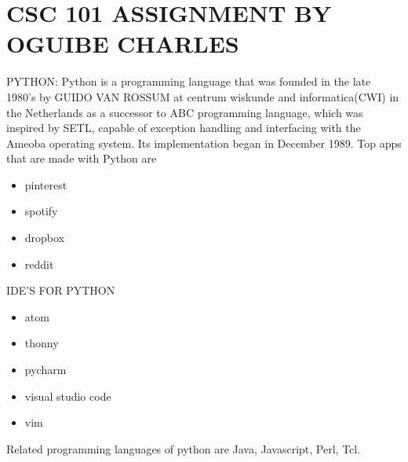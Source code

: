 \documentclass{article}
\begin{document}
  \section{CSC 101 ASSIGNMENT BY OGUIBE CHARLES}
                  {PYTHON:}
  Python is a programming language that was founded in the late 1980’s  by GUIDO VAN ROSSUM at centrum wiskunde and informatica(CWI) in the Netherlands as a successor to ABC programming language, which was inspired by SETL, capable of exception handling and interfacing with the Ameoba operating system. Its implementation began in December 1989.
  Top apps that are made with Python are
  \begin{itemize}
  \item{pinterest}
  \item{spotify}
  \item{dropbox}
  \item{reddit}
  \end{itemize}
    {IDE'S FOR PYTHON}
    \begin{itemize}
    \item{atom}
    \item{thonny}
    \item{pycharm}
    \item{visual studio code}
    \item{vim}
    \end{itemize}
    
    Related programming languages of python are Java, Javascript, Perl, Tcl.
    
   
\end{document}
